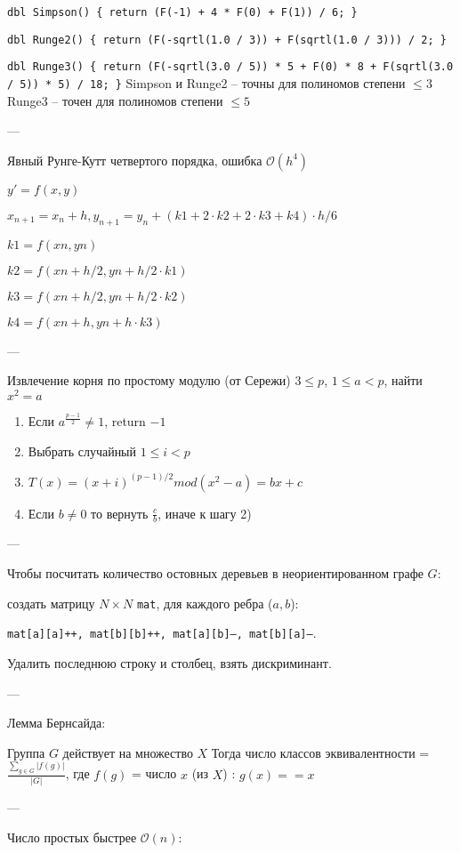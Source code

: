 \texttt{dbl Simpson() \{ return (F(-1) + 4 * F(0) + F(1)) / 6; \}}

\texttt{dbl Runge2() \{ return (F(-sqrtl(1.0 / 3)) + F(sqrtl(1.0 / 3))) / 2; \}}

\texttt{dbl Runge3() \{ return (F(-sqrtl(3.0 / 5)) * 5 + F(0) * 8 + F(sqrtl(3.0 / 5)) * 5) / 18; \}}
Simpson и Runge2 -- точны для полиномов степени $\le 3$
Runge3 -- точен для полиномов степени $\le 5$

---

Явный Рунге-Кутт четвертого порядка, ошибка $\mathcal{O}(h^4)$

$y' = f(x, y)$

$x_{n + 1} = x_n + h, y_{n+1} = y_n + (k1 + 2 \cdot k2 + 2 \cdot k3 + k4) \cdot h / 6$

$k1 = f(xn, yn)$

$k2 = f(xn + h/2, yn + h/2 \cdot k1)$

$k3 = f(xn + h/2, yn + h/2 \cdot k2)$

$k4 = f(xn + h, yn + h \cdot k3)$

---

Извлечение корня по простому модулю (от Сережи)
$3 \leq p$, $1 \leq a < p$, найти $x^2 = a$
\begin{enumerate}
\item Если $a^{\frac{p - 1}{2}} \ne 1$, return $-1$
\item Выбрать случайный $1 \leq i < p$
\item $T(x) = (x + i)^{(p - 1)/2} mod (x^2 - a) = bx + c$
\item Если $b \ne 0$ то вернуть $\frac{c}{b}$, иначе к шагу 2)
\end{enumerate}

---

Чтобы посчитать количество остовных деревьев в неориентированном графе $G$:

    создать матрицу $N \times N$ \texttt{mat}, для каждого ребра ($a, b$):
    
	\texttt{mat[a][a]++, mat[b][b]++, mat[a][b]--, mat[b][a]--}.
	
	Удалить последнюю строку и столбец, взять дискриминант.
	
---

Лемма Бернсайда:

Группа $G$ действует на множество $X$
Тогда число классов эквивалентности = $\frac{\sum_{g \in G} {|f(g)|}}{|G|}$,
где $f(g)$ = число $x$ (из $X$) : $g(x) == x$

---

Число простых быстрее $\mathcal{O}(n)$: 

